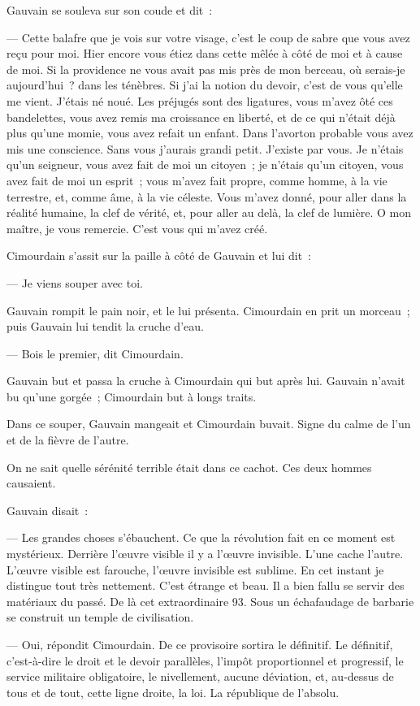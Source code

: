 \documentclass[french,twoside]{book} %
\begin{document}
Gauvain se souleva sur son coude et dit :\par
— Cette balafre que je vois sur votre visage, c’est le coup de sabre que vous avez reçu pour moi. Hier encore vous étiez dans cette mêlée à côté de moi et à cause de moi. Si la providence ne vous avait pas mis près de mon berceau, où serais-je aujourd’hui ? dans les ténèbres. Si j’ai la notion du devoir, c’est de vous qu’elle me vient. J’étais né noué. Les préjugés sont des ligatures, vous m’avez ôté ces bandelettes, vous avez remis ma croissance en liberté, et de ce qui n’était déjà plus qu’une momie, vous avez refait un enfant. Dans l’avorton probable vous avez mis une conscience. Sans vous j’aurais grandi petit. J’existe par  vous. Je n’étais qu’un seigneur, vous avez fait de moi un citoyen ; je n’étais qu’un citoyen, vous avez fait de moi un esprit ; vous m’avez fait propre, comme homme, à la vie terrestre, et, comme âme, à la vie céleste. Vous m’avez donné, pour aller dans la réalité humaine, la clef de vérité, et, pour aller au delà, la clef de lumière. O mon maître, je vous remercie. C’est vous qui m’avez créé.\par
Cimourdain s’assit sur la paille à côté de Gauvain et lui dit :\par
— Je viens souper avec toi.\par
Gauvain rompit le pain noir, et le lui présenta. Cimourdain en prit un morceau ; puis Gauvain lui tendit la cruche d’eau.\par
— Bois le premier, dit Cimourdain.\par
Gauvain but et passa la cruche à Cimourdain qui but après lui. Gauvain n’avait bu qu’une gorgée ; Cimourdain but à longs traits.\par
Dans ce souper, Gauvain mangeait et Cimourdain buvait. Signe du calme de l’un et de la fièvre de l’autre.\par
On ne sait quelle sérénité terrible était dans ce cachot. Ces deux hommes causaient.\par
Gauvain disait :\par
— Les grandes choses s’ébauchent. Ce que la révolution fait en ce moment est mystérieux. Derrière l’œuvre visible il y a l’œuvre invisible. L’une cache l’autre. L’œuvre visible est farouche, l’œuvre invisible est sublime. En cet instant je distingue tout très nettement. C’est étrange et beau. Il a bien fallu se  servir des matériaux du passé. De là cet extraordinaire 93. Sous un échafaudage de barbarie se construit un temple de civilisation.\par
— Oui, répondit Cimourdain. De ce provisoire sortira le définitif. Le définitif, c’est-à-dire le droit et le devoir parallèles, l’impôt proportionnel et progressif, le service militaire obligatoire, le nivellement, aucune déviation, et, au-dessus de tous et de tout, cette ligne droite, la loi. La république de l’absolu.\par
\end{document}
